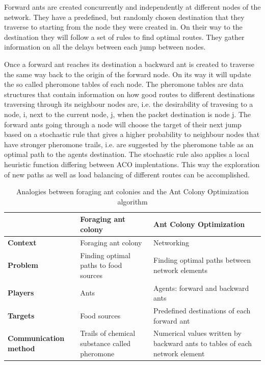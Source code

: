 \documentclass[cameraready]{IWORK2014}
\begin{document}
Forward ants are created concurrently and independently at different nodes of the network. They have a predefined, but randomly chosen destination that they traverse to starting from the node they were created in. On their way to the destination they will follow a set of rules to find optimal routes. They gather information on all the delays between each jump between nodes.

Once a forward ant reaches its destination a backward ant is created to traverse the same way back to the origin of the forward node. On its way it will update the so called pheromone tables of each node. The pheromone tables are data structures that contain information on how good routes to different destinations traversing through its neighbour nodes are, i.e. the desirability of travesing to a node, i, next to the current node, j, when the packet destination is node j. The forward ants going through a node will choose the target of their next jump based on a stochastic rule that gives a higher probability to neighbour nodes that have stronger pheromone trails, i.e. are suggested by the pheromone table as an optimal path to the agents destination. The stochastic rule also applies a local heuristic function differing between ACO implentations. This way the exploration of new paths as well as load balancing of different routes can be accomplished.

\begin{table}
	\begin{tabularx}{0.90\textwidth}{|X|X|X|}
		\hline & \textbf{Foraging ant colony} & \textbf{Ant Colony Optimization} \\ \hline
		\textbf{Context} & Foraging ant colony & Networking \\ \hline
		\textbf{Problem} & Finding optimal paths to food sources & Finding optimal paths between network elements \\ \hline
		\textbf{Players} & Ants & Agents: forward and backward ants \\ \hline
		\textbf{Targets} & Food sources & Predefined destinations of each forward ant \\ \hline
		\textbf{Communication method} & Trails of chemical substance called pheromone & Numerical values written by backward ants to tables of each network element \\ \hline
	\end{tabularx}
	\caption{Analogies between foraging ant colonies and the Ant Colony Optimization algorithm}
	\label{tbl:analogies_ant}
\end{table}
\end{document}

